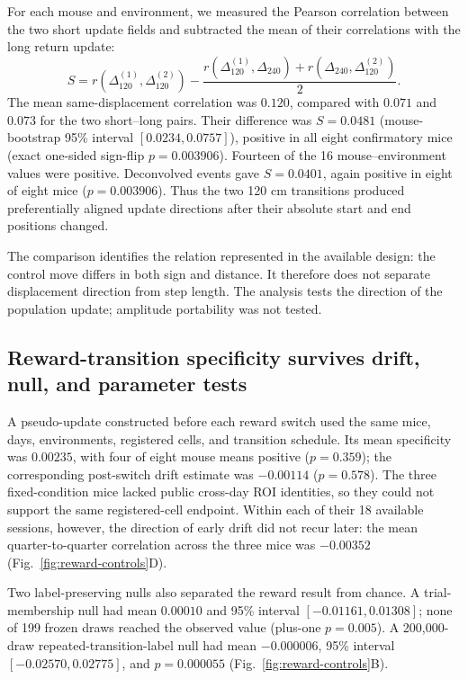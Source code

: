 \documentclass[10pt,twocolumn]{article}
\begin{document}
For each mouse and environment, we measured the Pearson correlation between
the two short update fields and subtracted the mean of their correlations with
the long return update:
\begin{equation}
 S = r(\Delta_{120}^{(1)},\Delta_{120}^{(2)})
 -\frac{r(\Delta_{120}^{(1)},\Delta_{240})
 +r(\Delta_{240},\Delta_{120}^{(2)})}{2}.
\label{eq:reward-specificity}
\end{equation}
The mean same-displacement correlation was $0.120$, compared with $0.071$ and
$0.073$ for the two short--long pairs. Their difference was $S=0.0481$
(mouse-bootstrap 95\% interval $[0.0234,0.0757]$), positive in all eight
confirmatory mice (exact one-sided sign-flip $p=0.003906$). Fourteen of the 16
mouse--environment values were positive. Deconvolved events gave
$S=0.0401$, again positive in eight of eight mice ($p=0.003906$). Thus the two
120 cm transitions produced preferentially aligned update directions after
their absolute start and end positions changed.

The comparison identifies the relation represented in the available design:
the control move differs in both sign and distance. It therefore does not
separate displacement direction from step length. The analysis tests the
direction of the population update; amplitude portability was not tested.

\subsection{Reward-transition specificity survives drift, null, and parameter tests}

A pseudo-update constructed before each reward switch used the same mice,
days, environments, registered cells, and transition schedule. Its mean
specificity was $0.00235$, with four of eight mouse means positive
($p=0.359$); the corresponding post-switch drift estimate was $-0.00114$
($p=0.578$). The three fixed-condition mice lacked public cross-day ROI
identities, so they could not support the same registered-cell endpoint.
Within each of their 18 available sessions, however, the direction of early
drift did not recur later: the mean quarter-to-quarter correlation across the
three mice was $-0.00352$ (Fig.~\ref{fig:reward-controls}D).

Two label-preserving nulls also separated the reward result from chance. A
trial-membership null had mean $0.00010$ and 95\% interval
$[-0.01161,0.01308]$; none of 199 frozen draws reached the observed value
(plus-one $p=0.005$). A 200,000-draw repeated-transition-label null had mean
$-0.000006$, 95\% interval $[-0.02570,0.02775]$, and $p=0.000055$
(Fig.~\ref{fig:reward-controls}B).
\end{document}
